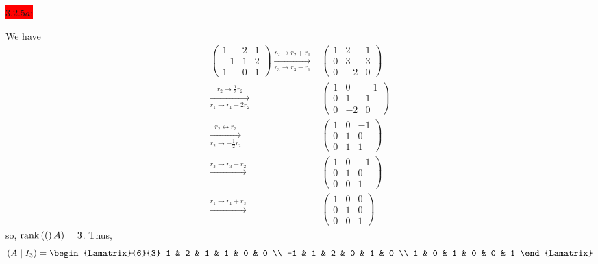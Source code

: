 \documentclass{exam}
\begin{document}
  \colorbox{red}{\underline{$3.2.5a$}:}
  \begin{solution}
    We have 
    \begin{align*}
      \begin{pmatrix}
        1 & 2 & 1 \\
        -1 & 1 & 2 \\
        1 & 0 & 1
      \end{pmatrix}
      \xrightarrow[r_3 \to r_3 - r_1]{r_2 \to r_2 + r_1}& \begin{pmatrix}
        1 & 2 & 1 \\
        0 & 3 & 3 \\
        0 & -2 & 0 
      \end{pmatrix} \\
      \xrightarrow[r_1 \to r_1 - 2r_2]{r_2 \to \frac{1}{3}r_2}& \begin{pmatrix}
        1 & 0 & -1 \\
        0 & 1 & 1 \\
        0 & -2 & 0
      \end{pmatrix} \\
      \xrightarrow[r_2 \to -\frac{1}{2}r_2]{r_2 \leftrightarrow r_3}& \begin{pmatrix}
        1 & 0 & -1 \\
        0 & 1 & 0 \\
        0 & 1 & 1 
      \end{pmatrix} \\
      \xrightarrow{r_3 \to r_3 - r_2}& \begin{pmatrix}
        1 & 0 & -1 \\
        0 & 1 & 0 \\
        0 & 0 & 1
      \end{pmatrix} \\
      \xrightarrow{r_1 \to r_1 + r_3}& \begin{pmatrix}
        1 & 0 & 0 \\
        0 & 1 & 0 \\
        0 & 0 & 1
      \end{pmatrix}
    \end{align*}
    so, $\text{rank}\left((\right)A) = 3$. Thus, 
    \begin{align*}
      (A \mid I_3) = \begin{Lamatrix}{6}{3}
        1 & 2 & 1 & 1 & 0 & 0 \\
        -1 & 1 & 2 & 0 & 1 & 0 \\
        1 & 0 & 1 & 0 & 0 & 1
      \end{Lamatrix}

\end{align*}
\end{solution}
\end{document}
